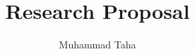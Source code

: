 \documentclass[pageno]{jpaper}
\begin{document}
\date{}

\title{Research Proposal}
\author{Muhammad Taha}

\maketitle






% 
% 
% 


% 

% 
\end{document}

